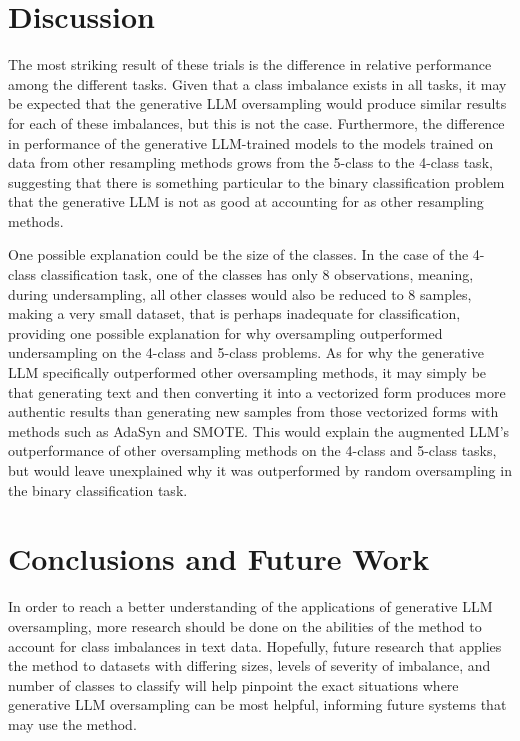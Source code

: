 \documentclass[runningheads]{llncs}
\begin{document}
\section{Discussion}
The most striking result of these trials is the difference in relative performance among the different tasks. Given that a class imbalance exists in all tasks, it may be expected that the generative LLM oversampling would produce similar results for each of these imbalances, but this is not the case. Furthermore, the difference in performance of the generative LLM-trained models to the models trained on data from other resampling methods grows from the 5-class to the 4-class task, suggesting that there is something particular to the binary classification problem that the generative LLM is not as good at accounting for as other resampling methods.

One possible explanation could be the size of the classes. In the case of the 4-class classification task, one of the classes has only 8 observations, meaning, during undersampling, all other classes would also be reduced to 8 samples, making a very small dataset, that is perhaps inadequate for classification, providing one possible explanation for why oversampling outperformed undersampling on the 4-class and 5-class problems. As for why the generative LLM specifically outperformed other oversampling methods, it may simply be that generating text and then converting it into a vectorized form produces more authentic results than generating new samples from those vectorized forms with methods such as AdaSyn and SMOTE. This would explain the augmented LLM's outperformance of other oversampling methods on the 4-class and 5-class tasks, but would leave unexplained why it was outperformed by random oversampling in the binary classification task.

\section{Conclusions and Future Work}
In order to reach a better understanding of the applications of generative LLM oversampling, more research should be done on the abilities of the method to account for class imbalances in text data. Hopefully, future research that applies the method to datasets with differing sizes, levels of severity of imbalance, and number of classes to classify will help pinpoint the exact situations where generative LLM oversampling can be most helpful, informing future systems that may use the method.
\end{document}

